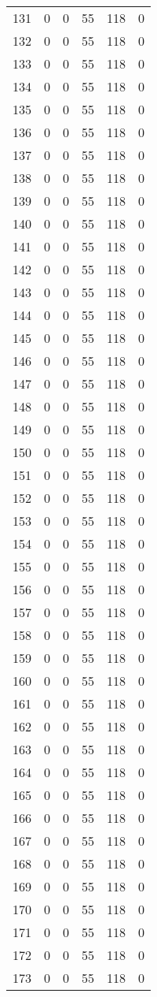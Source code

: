 \documentclass[a4paper]{ctexart}
\begin{document}
\begin{longtable}{p{1cm}|p{2cm}|p{2cm}|p{2cm}|P{2cm}|p{2cm}}
		131&0&0&55&118&0\\
		132&0&0&55&118&0\\
		133&0&0&55&118&0\\
		134&0&0&55&118&0\\
		135&0&0&55&118&0\\
		136&0&0&55&118&0\\
		137&0&0&55&118&0\\
		138&0&0&55&118&0\\
		139&0&0&55&118&0\\
		140&0&0&55&118&0\\
		141&0&0&55&118&0\\
		142&0&0&55&118&0\\
		143&0&0&55&118&0\\
		144&0&0&55&118&0\\
		145&0&0&55&118&0\\
		146&0&0&55&118&0\\
		147&0&0&55&118&0\\
		148&0&0&55&118&0\\
		149&0&0&55&118&0\\
		150&0&0&55&118&0\\
		151&0&0&55&118&0\\
		152&0&0&55&118&0\\
		153&0&0&55&118&0\\
		154&0&0&55&118&0\\
		155&0&0&55&118&0\\
		156&0&0&55&118&0\\
		157&0&0&55&118&0\\
		158&0&0&55&118&0\\
		159&0&0&55&118&0\\
		160&0&0&55&118&0\\
		161&0&0&55&118&0\\
		162&0&0&55&118&0\\
		163&0&0&55&118&0\\
		164&0&0&55&118&0\\
		165&0&0&55&118&0\\
		166&0&0&55&118&0\\
		167&0&0&55&118&0\\
		168&0&0&55&118&0\\
		169&0&0&55&118&0\\
		170&0&0&55&118&0\\
		171&0&0&55&118&0\\
		172&0&0&55&118&0\\
		173&0&0&55&118&0\\

\end{longtable}
\end{document}
